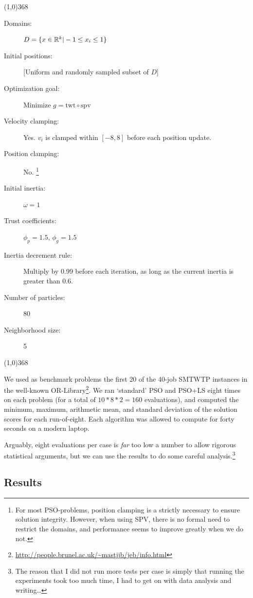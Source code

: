 \documentclass[a4paper,final,9pt]{article}
\begin{document}
\noindent
\line(1,0){368}
{\footnotesize
\begin{description}
  \item[Domains:] $D = \{ x \in \mathbb{R}^k | -1 \leq x_i \leq 1 \}$
  \item[Initial positions:] [Uniform and randomly sampled subset of $D$]
  \item[Optimization goal:] Minimize $g = \text{twt} \circ \text{spv}$
  \item[Velocity clamping:] Yes. $v_i$ is clamped within $[-8, 8]$ before each
    position update. 
  \item[Position clamping:] No. \footnote{For most PSO-problems, position
    clamping is a strictly necessary to ensure solution integrity. However,
    when using SPV, there is no formal need to restrict the domains, and
    performance seems to improve greatly when we do not.}
  \item[Initial inertia:] $\omega = 1$ 
  \item[Trust coefficients:] $\phi_p = 1.5$, $\phi_g = 1.5$
  \item[Inertia decrement rule:] Multiply by 0.99 before each iteration, as
    long as the current inertia is greater than $0.6$.
  \item[Number of particles:] 80
  \item[Neighborhood size:] 5
\end{description}
}
\noindent
\line(1,0){368}

\noindent
We used as benchmark problems the first 20 of the 40-job SMTWTP instances in
the well-known
OR-Library\footnote{\url{http://people.brunel.ac.uk/~mastjjb/jeb/info.html}}.
We ran `standard' PSO and PSO+LS eight times on each problem (for a total of
$10*8*2 = 160$ evaluations), and computed the minimum, maximum, arithmetic
mean, and standard deviation of the solution scores for each run-of-eight.
Each algorithm was allowed to compute for forty seconds on a modern laptop.

Arguably, eight evaluations per case is \emph{far} too low a number to allow
rigorous statistical arguments, but we can use the results to do some
careful analysis.\footnote{The reason that I did not run more tests per case
is simply that running the experiments took too much time, I had to
get on with data analysis and writing\ldots}


\subsection{Results}
\end{document}

